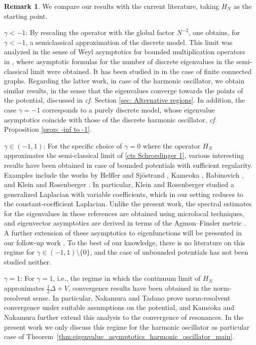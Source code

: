 \documentclass[12pt, reqno]{amsart}
\theoremstyle{definition}
\newtheorem*{remark}{Remark}
\numberwithin{equation}{section}
\begin{document}
\begin{remark}\label{rmk:wichtig}
We compare our results with the current literature, taking  $H_{N}$ as the starting point. \smallskip

$  \gamma<-1$: By rescaling the operator with the global factor $N^{-2}$, one obtains, for $\gamma<-1$, a semiclassical approximation of the discrete model. This  limit was analyzed in the sense of Weyl asymptotics  for bounded multiplication operators in \cite{Bach_Pedra_Lakaev_2017}, where {asymp}\-totic formulas for the number of discrete eigenvalues in the semi-classical limit  were obtained. It has been studied in \cite{Linn_Lippner_Yau_2012} in the case of  finite connected graphs. Regarding the latter work, in case of the harmonic oscillator, we obtain similar results, in the sense that the eigenvalues converge towards the points of the potential, discussed in \textit{cf.} Section \ref{sec: Alternative regions}. In addition, the case $\gamma=-1$ corresponds to a purely discrete model, whose eigenvalue asymptotics coincide with those of the discrete harmonic oscillator, \textit{cf.} Proposition \ref{prop: -inf to -1}.\smallskip



$ \gamma\in (-1,1)$: For the specific choice of $\gamma=0$ where the operator $H_N$ approximates the semi-classical limit of \eqref{cts Schroedinger 1}, various interesting results  have been obtained in case of bounded potentials with sufficient regularity. Examples include the works by Helffer and Sj\"{o}strand \cite{HorHel_1988}, Kameoka \cite{Kameoka_2023}, Rabinovich \cite{Rabi}, and Klein and Rosenberger \cite{Klein_Rosenberger_2009}. In particular, Klein and Rosenberger studied a generalized Laplacian with variable coefficients, which in our setting reduces to the constant-coefficient Laplacian.
    Unlike the present work, the spectral estimates for the eigenvalues in these references are obtained using microlocal techniques, and eigenvector asymptotics are derived in terms of the Agmon–Finsler metric \cite{Kameoka_2023,Klein_Rosenberger_2008}.  A further extension of these asymptotics to eigenfunctions will be presented in our follow-up work \cite{Keller_Pettinari_Ven_Part2}. To the best of our knowledge, there is no literature on this regime for $\gamma\in (-1,1)\setminus\{0\}$, and the case of unbounded potentials has not been studied neither.  \smallskip


$\gamma=1$: For $\gamma=1$, i.e., the regime in which the continuum limit of $H_N$ approximates $\tfrac{1}{2}\Delta + V$, convergence results have been obtained in the norm-resolvent sense. In particular, Nakamura and Tadano \cite{Nakamura_2021} prove norm-resolvent convergence under suitable assumptions on the potential, and Kameoka and Nakamura \cite{Kameoka_2024} further extend this analysis to the convergence of resonances. In the present work we only discuss this regime for the harmonic oscillator as particular case of Theorem~\ref{thm:eigenvalue_asymptotics_harmonic_oscillator_main}.\smallskip



\end{remark}
\end{document}
